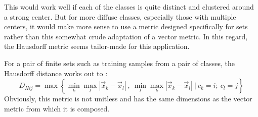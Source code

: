 \documentclass{article}
\begin{document}
This would work well if each of the classes is quite distinct and clustered around a strong center.
But for more diffuse classes, especially those with multiple centers, it would make more sense to use a metric designed specifically for sets rather than this somewhat crude adaptation of a vector metric.
In this regard, the Hausdorff metric seems tailor-made for this application.

For a pair of finite sets such as training samples from a pair of classes,
the Hausdorff distance works out to \citep{Ott1993, Gulick1992}:
\begin{equation}
D_{Hij} = \max \left \lbrace \min_k \max_l | \vec x_k - \vec x_l|~,~\min_l \max_k | \vec x_k - \vec x_l| ~ |~c_k=i;~c_l=j \right \rbrace
\end{equation}
Obviously, this metric is not unitless and has the same dimensions as the
vector metric from which it is composed.


\end{document}

